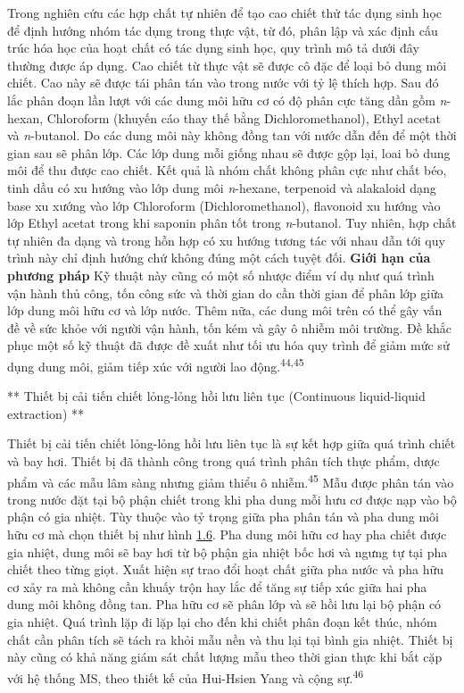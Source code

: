 \documentclass[
  letterpaper,
  DIV=11,
  numbers=noendperiod]{scrartcl}
\begin{document}
Trong nghiên cứu các hợp chất tự nhiên để tạo cao chiết thử tác dụng
sinh học để định hướng nhóm tác dụng trong thực vật, từ đó, phân lập và
xác định cấu trúc hóa học của hoạt chất có tác dụng sinh học, quy trình
mô tả dưới đây thường được áp dụng. Cao chiết từ thực vật sẽ được cô đặc
để loại bỏ dung môi chiết. Cao này sẽ được tái phân tán vào trong nước
với tỷ lệ thích hợp. Sau đó lắc phân đoạn lần lượt với các dung môi hữu
cơ có độ phân cực tăng dần gồm \emph{n}-hexan, Chloroform (khuyến cáo
thay thế bằng Dichloromethanol), Ethyl acetat và \emph{n}-butanol. Do
các dung môi này không đồng tan với nước dẫn đến để một thời gian sau sẽ
phân lớp. Các lớp dung mỗi giống nhau sẽ được gộp lại, loai bỏ dung môi
để thu được cao chiết. Kết quả là nhóm chất không phân cực như chất béo,
tinh dầu có xu hướng vào lớp dung môi \emph{n}-hexane, terpenoid và
alakaloid dạng base xu xướng vào lớp Chloroform (Dichloromethanol),
flavonoid xu hướng vào lớp Ethyl acetat trong khi saponin phân tốt trong
\emph{n}-butanol. Tuy nhiên, hợp chất tự nhiên đa dạng và trong hỗn hợp
có xu hướng tương tác với nhau dẫn tới quy trình này chỉ định hướng chứ
không đúng một cách tuyệt đối. \textbf{Giới hạn của phương pháp} Kỹ
thuật này cũng có một số nhược điểm ví dụ như quá trình vận hành thủ
công, tốn công sức và thời gian do cần thời gian để phân lớp giữa lớp
dung môi hữu cơ và lớp nước. Thêm nữa, các dung môi trên có thể gây vấn
đề về sức khỏe với người vận hành, tốn kém và gây ô nhiễm môi trường. Đề
khắc phục một số kỹ thuật đã được đề xuất như tối ưu hóa quy trình để
giảm mức sử dụng dung môi, giảm tiếp xúc với người lao
động.\textsuperscript{44,45}

** Thiết bị cải tiến chiết lỏng-lỏng hồi lưu liên tục (Continuous
liquid-liquid extraction) **

Thiết bị cải tiến chiết lỏng-lỏng hồi lưu liên tục là sự kết hợp giữa
quá trình chiết và bay hơi. Thiết bị đã thành công trong quá trình phân
tích thực phẩm, dược phẩm và các mẫu lâm sàng nhưng giảm thiểu ô
nhiễm.\textsuperscript{45} Mẫu được phân tán vào trong nước đặt tại bộ
phận chiết trong khi pha dung mỗi hưu cơ được nạp vào bộ phận có gia
nhiệt. Tùy thuộc vào tỷ trọng giữa pha phân tán và pha dung môi hữu cơ
mà chọn thiết bị như hình
\hyperref[fig:Extractionux5cux2520Apparatusux5cux2520Ofux5cux2520Thomas]{1.6}.
Pha dung môi hữu cơ hay pha chiết được gia nhiệt, dung môi sẽ bay hơi từ
bộ phận gia nhiệt bốc hơi và ngưng tự tại pha chiết theo từng giọt. Xuất
hiện sự trao đổi hoạt chất giữa pha nước và pha hữu cơ xảy ra mà không
cần khuấy trộn hay lắc để tăng sự tiếp xúc giữa hai pha dung môi không
đồng tan. Pha hữu cơ sẽ phân lớp và sẽ hồi lưu lại bộ phận có gia nhiệt.
Quá trình lặp đi lặp lại cho đến khi chiết phân đoạn kết thúc, nhóm chất
cần phân tích sẽ tách ra khỏi mẫu nền và thu lại tại bình gia nhiệt.
Thiết bị này cũng có khả năng giám sát chất lượng mẫu theo thời gian
thực khi bắt cặp với hệ thống MS, theo thiết kế của Hui-Hsien Yang và
cộng sự.\textsuperscript{46}
\end{document}
